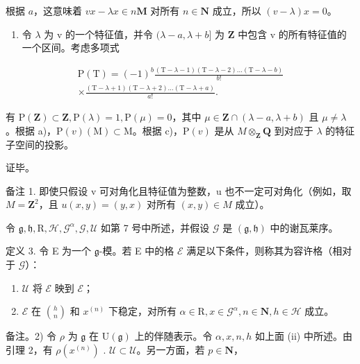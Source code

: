 根据 \(a\)，这意味着 \(vx - \lambda x \in n\mathbf{M}\) 对所有 \(n \in \mathbf{N}\) 成立，所以 \((v - \lambda)x = 0\)。

\begin{enumerate}
\def\labelenumi{\alph{enumi})}
\setcounter{enumi}{3}
\tightlist
\item
  令 \(\lambda\) 为 v 的一个特征值，并令 \((\lambda - a, \lambda + b]\) 为 \(\mathbf{Z}\) 中包含 v 的所有特征值的一个区间。考虑多项式
\end{enumerate}

\[
\begin{array}{c} \mathrm{P(T)} = (- 1) ^ {b} \frac {(\mathrm{T} - \lambda - 1) (\mathrm{T} - \lambda - 2) \ldots (\mathrm{T} - \lambda - b)}{b !} \\ \times \frac {(\mathrm{T} - \lambda + 1) (\mathrm{T} - \lambda + 2) \ldots (\mathrm{T} - \lambda + a)}{a !}. \end{array}
\]

有 \(\mathrm{P}(\mathbf{Z})\subset\mathbf{Z},\mathrm{P}(\lambda)=1,\mathrm{P}(\mu)=0\)，其中 \(\mu\in\mathbf{Z}\cap(\lambda-a,\lambda+b)\) 且 \(\mu\neq\lambda\)。根据 a)，\(\mathrm{P}(v)(\mathrm{M})\subset\mathrm{M}\)。根据 c)，\(\mathrm{P}(v)\) 是从 \(M\otimes_{\mathbf{Z}}\mathbf{Q}\) 到对应于 \(\lambda\) 的特征子空间的投影。

证毕。

备注 1. 即使只假设 v 可对角化且特征值为整数，u 也不一定可对角化（例如，取 \(M = \mathbf{Z}^{2}\)，且 \(u(x, y) = (y, x)\) 对所有 \((x, y) \in M\) 成立）。

令 \(\mathfrak{g},\mathfrak{h},\mathrm{R},\mathcal{H},\mathcal{G}^{\alpha},\mathcal{G},\mathcal{U}\) 如第 7 号中所述，并假设 \(\mathcal{G}\) 是 \((\mathfrak{g},\mathfrak{h})\) 中的谢瓦莱序。

定义 3. 令 E 为一个 \(\mathfrak{g}\)-模。若 E 中的格 \(\mathcal{E}\) 满足以下条件，则称其为容许格（相对于 \(\mathcal{G}\)）：

\begin{enumerate}
\def\labelenumi{(\roman{enumi})}
\item
  \(\mathcal{U}\) 将 \(\mathcal{E}\) 映到 \(\mathcal{E}\)；
\item
  \(\mathcal{E}\) 在 \(\binom{h}{n}\) 和 \(x^{(n)}\) 下稳定，对所有 \(\alpha \in \mathrm{R}, x \in \mathcal{G}^{\alpha}, n \in \mathbf{N}, h \in \mathcal{H}\) 成立。
\end{enumerate}

备注。2) 令 \(\rho\) 为 \(\mathfrak{g}\) 在 \(\mathrm{U}(\mathfrak{g})\) 上的伴随表示。令 \(\alpha, x, n, h\) 如上面 (ii) 中所述。由引理 2，有 \(\rho(x^{(n)})\) . \(\mathcal{U} \subset \mathcal{U}\)。另一方面，若 \(p \in \mathbf{N}\)，

